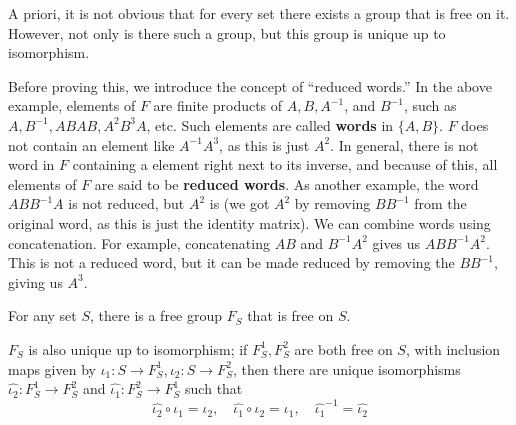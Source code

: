 A priori, it is not obvious that for every set there exists a group that is free on it. However, not only is there such a group, but this group is unique up to isomorphism. 

Before proving this, we introduce the concept of ``reduced words.'' In the above example, elements of $F$ are finite products of $A,B,A^{-1}$, and $B^{-1}$, such as $A,B^{-1}, ABAB, A^2B^3A$, etc. Such elements are called \textbf{words} in $\{A,B\}$. $F$ does not contain an element like $A^{-1}A^3$, as this is just $A^2$. In general, there is not word in $F$ containing a element right next to its inverse, and because of this, all elements of $F$ are said to be \textbf{reduced words}. As another example, the word $ABB^{-1}A$ is not reduced, but $A^2$ is (we got $A^2$ by removing $BB^{-1}$ from the original word, as this is just the identity matrix). We can combine words using concatenation. For example, concatenating $AB$ and $B^{-1}A^2$ gives us $ABB^{-1}A^2$. This is not a reduced word, but it can be made reduced by removing the $BB^{-1}$, giving us $A^3$.

\begin{thm}\label{Free Groups Exist}
    For any set $S$, there is a free group $F_S$ that is free on $S$.

    $F_S$ is also unique up to isomorphism; if $F^1_S, F^2_S$ are both free on $S$, with inclusion maps given by $\iota_1: S \to F^1_S, \iota_2: S \to F^2_S$, then there are unique isomorphisms $\hat{\iota_2}: F_S^1 \to F_S^2$ and $\hat{\iota_1}: F_S^2 \to F_S^1$ such that
    \[ \hat{\iota_2} \circ \iota_1 = \iota_2, \quad \hat{\iota_1} \circ \iota_2 = \iota_1, \quad \hat{\iota_1}^{-1} = \hat{\iota_2}\]
\end{thm}


